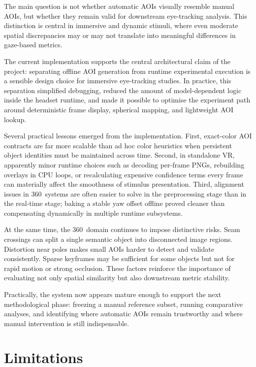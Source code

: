 \documentclass[11pt]{article}
\begin{document}
The main question is not whether automatic AOIs visually resemble manual AOIs, but whether they remain valid for downstream eye-tracking analysis. This distinction is central in immersive and dynamic stimuli, where even moderate spatial discrepancies may or may not translate into meaningful differences in gaze-based metrics.

The current implementation supports the central architectural claim of the project: separating offline AOI generation from runtime experimental execution is a sensible design choice for immersive eye-tracking studies. In practice, this separation simplified debugging, reduced the amount of model-dependent logic inside the headset runtime, and made it possible to optimise the experiment path around deterministic frame display, spherical mapping, and lightweight AOI lookup.

Several practical lessons emerged from the implementation. First, exact-color AOI contracts are far more scalable than ad hoc color heuristics when persistent object identities must be maintained across time. Second, in standalone VR, apparently minor runtime choices such as decoding per-frame PNGs, rebuilding overlays in CPU loops, or recalculating expensive confidence terms every frame can materially affect the smoothness of stimulus presentation. Third, alignment issues in 360\textdegree\ systems are often easier to solve in the preprocessing stage than in the real-time stage; baking a stable yaw offset offline proved cleaner than compensating dynamically in multiple runtime subsystems.

At the same time, the 360\textdegree\ domain continues to impose distinctive risks. Seam crossings can split a single semantic object into disconnected image regions. Distortion near poles makes small AOIs harder to detect and validate consistently. Sparse keyframes may be sufficient for some objects but not for rapid motion or strong occlusion. These factors reinforce the importance of evaluating not only spatial similarity but also downstream metric stability.

Practically, the system now appears mature enough to support the next methodological phase: freezing a manual reference subset, running comparative analyses, and identifying where automatic AOIs remain trustworthy and where manual intervention is still indispensable.

\section{Limitations}
\end{document}
